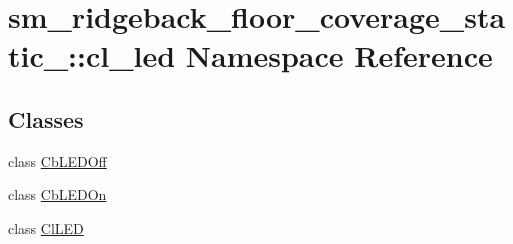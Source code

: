 \hypertarget{namespacesm__ridgeback__floor__coverage__static__1_1_1cl__led}{}\section{sm\+\_\+ridgeback\+\_\+floor\+\_\+coverage\+\_\+static\+\_\+:\+:cl\+\_\+led Namespace Reference}
\label{namespacesm__ridgeback__floor__coverage__static__1_1_1cl__led}
\subsection*{Classes}
\begin{DoxyCompactItemize}
\item 
class \hyperlink{classsm__ridgeback__floor__coverage__static__1_1_1cl__led_1_1CbLEDOff}{Cb\+L\+E\+D\+Off}
\item 
class \hyperlink{classsm__ridgeback__floor__coverage__static__1_1_1cl__led_1_1CbLEDOn}{Cb\+L\+E\+D\+On}
\item 
class \hyperlink{classsm__ridgeback__floor__coverage__static__1_1_1cl__led_1_1ClLED}{Cl\+L\+ED}
\end{DoxyCompactItemize}
